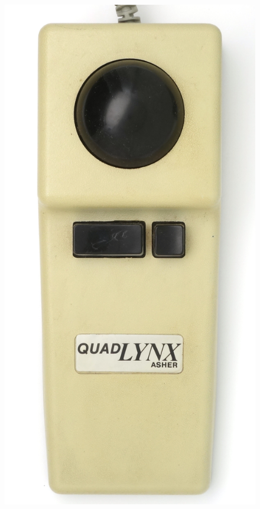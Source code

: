 \documentclass[11pt, a4paper]{article}
\begin{document}
\begin{figure}[h]
    \centering
    \includegraphics[scale=0.4]{1986_honeywell_asher_quadlynx_trackball/top_30.jpg}

\end{figure}
\end{document}
